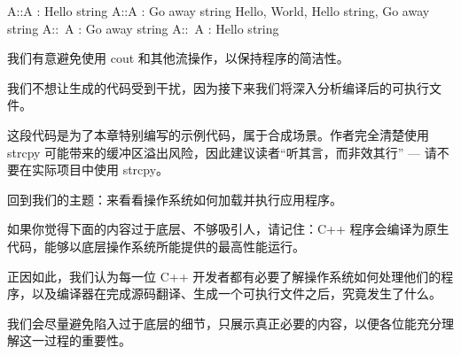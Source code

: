 \begin{shell}
A::A : Hello string
A::A : Go away string
Hello, World, Hello string, Go away string
A::~A : Go away string
A::~A : Hello string
\end{shell}

我们有意避免使用 cout 和其他流操作，以保持程序的简洁性。

我们不想让生成的代码受到干扰，因为接下来我们将深入分析编译后的可执行文件。

这段代码是为了本章特别编写的示例代码，属于合成场景。作者完全清楚使用 strcpy 可能带来的缓冲区溢出风险，因此建议读者“听其言，而非效其行” --- 请不要在实际项目中使用 strcpy。

回到我们的主题：来看看操作系统如何加载并执行应用程序。

如果你觉得下面的内容过于底层、不够吸引人，请记住：C++ 程序会编译为原生代码，能够以底层操作系统所能提供的最高性能运行。

正因如此，我们认为每一位 C++ 开发者都有必要了解操作系统如何处理他们的程序，以及编译器在完成源码翻译、生成一个可执行文件之后，究竟发生了什么。

我们会尽量避免陷入过于底层的细节，只展示真正必要的内容，以便各位能充分理解这一过程的重要性。











































